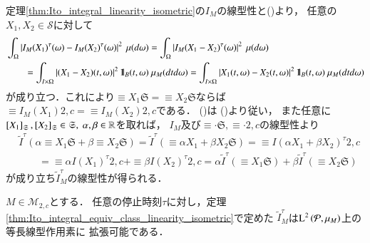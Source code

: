	\begin{prf}
		定理\ref{thm:Ito_integral_linearity_isometric}の$I_M$の線型性と()より，
		任意の$X_1,X_2 \in \mathcal{S}$に対して
		\begin{align}
			&\int_\Omega \left| I_M(X_1)^\tau(\omega) - I_M(X_2)^\tau(\omega) \right|^2\ \mu(d\omega)
			= \int_\Omega \left| I_M(X_1 - X_2)^\tau(\omega) \right|^2\ \mu(d\omega) \\
			&\qquad = \int_{I \times \Omega} \left| (X_1 - X_2)(t,\omega) \right|^2 \defunc_B(t,\omega)\ \mu_M(dtd\omega)
			= \int_{I \times \Omega} \left| X_1(t,\omega) - X_2(t,\omega) \right|^2 \defunc_B(t,\omega)\ \mu_M(dtd\omega)
		\end{align}
		が成り立つ．これにより$\equiv{X_1}{\mathfrak{S}} = \equiv{X_2}{\mathfrak{S}}$ならば
		$\equiv{I_M(X_1)}{2,c} = \equiv{I_M(X_2)}{2,c}$である．
		()は
		()より従い，
		また任意に$\left[X_1\right]_{\mathfrak{S}},\left[X_2\right]_{\mathfrak{S}} \in \mathfrak{S},\ \alpha,\beta \in \mathbb{R}$を取れば，
		$I_M$及び$\equiv{\cdot}{\mathfrak{S}},\equiv{\cdot}{2,c}$の線型性より
		\begin{align}
			&\tilde{I}^\tau \left( \alpha \equiv{X_1}{\mathfrak{S}} + \beta \equiv{X_2}{\mathfrak{S}} \right)
			= \tilde{I}^\tau \left( \equiv{\alpha X_1 + \beta X_2}{\mathfrak{S}} \right)
			= \equiv{I(\alpha X_1 + \beta X_2)^\tau}{2,c} \\
			&\qquad = \equiv{\alpha I(X_1)^\tau}{2,c} + \equiv{\beta I(X_2)^\tau}{2,c}
			= \alpha \tilde{I}^\tau \left( \equiv{X_1}{\mathfrak{S}} \right) + \beta \tilde{I}^\tau \left( \equiv{X_2}{\mathfrak{S}} \right)
		\end{align}
		が成り立ち$\tilde{I}^\tau_M$の線型性が得られる．
		\QED
	\end{prf}
	
	\begin{screen}
		\begin{thm}[同値類に対する伊藤積分の拡張]
			$M \in \mathcal{M}_{2,c}$とする．
			任意の停止時刻$\tau$に対し，定理\ref{thm:Ito_integral_equiv_class_linearity_isometric}で定めた
			$\tilde{I}^\tau_M$は$\operatorname{L}^{2} \left(\mathcal{P},\mu_M\right)$上の等長線型作用素に
			拡張可能である．
			\label{thm:expansion_of_Ito_integral_equiv_class}
		\end{thm}
	\end{screen}
	
